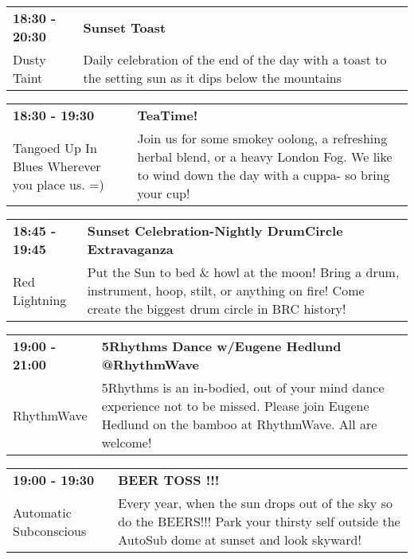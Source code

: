 \begin{tabular}{ p{1in} p{2.2in} }
    \textbf{18:30 - 20:30} & \textbf{Sunset Toast} \\
    Dusty Taint \newline  & Daily celebration of the end of the day with a toast to the setting sun as it dips below the mountains \\
    \hline 
\end{tabular}
    
\begin{tabular}{ p{1in} p{2.2in} }
    \textbf{18:30 - 19:30} & \textbf{TeaTime!} \\
    Tangoed Up In Blues \newline Wherever you place us. =) & Join us for some smokey oolong, a refreshing herbal blend, or a heavy London Fog.  We like to wind down the day with a cuppa- so bring your cup! \\
    \hline 
\end{tabular}
    
\begin{tabular}{ p{1in} p{2.2in} }
    \textbf{18:45 - 19:45} & \textbf{Sunset Celebration-Nightly DrumCircle Extravaganza} \\
    Red Lightning \newline  & Put the Sun to bed \& howl at the moon! Bring a drum, instrument, hoop, stilt, or anything on fire! Come create the biggest drum circle in BRC history! \\
    \hline 
\end{tabular}
    
\begin{tabular}{ p{1in} p{2.2in} }
    \textbf{19:00 - 21:00} & \textbf{5Rhythms Dance w/Eugene Hedlund @RhythmWave} \\
    RhythmWave \newline  & 5Rhythms is an in-bodied, out of your mind dance experience not to be missed. Please join Eugene Hedlund on the bamboo at RhythmWave. All are welcome! \\
    \hline 
\end{tabular}
    
\begin{tabular}{ p{1in} p{2.2in} }
    \textbf{19:00 - 19:30} & \textbf{BEER TOSS !!!} \\
    Automatic Subconscious \newline  & Every year, when the sun drops out of the sky so do the BEERS!!! Park your thirsty self outside the AutoSub dome at sunset and look skyward! \\
    \hline 
\end{tabular}
    
